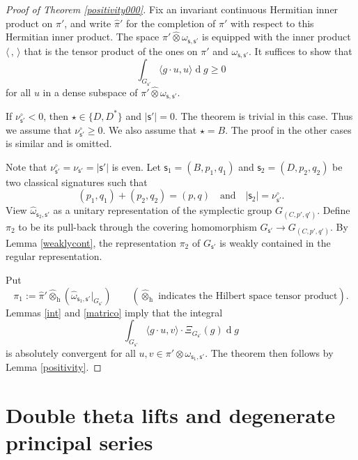 \documentclass[12pt,a4paper]{amsart}
\def\abs#1{\left|{#1}\right|}
\newcommand{\od}{\operatorname{d}}
\newcommand{\la}{\langle}
\newcommand{\ra}{\rangle}
\numberwithin{equation}{section}
\theoremstyle{remark}
\begin{document}
\begin{proof}[Proof of Theorem \ref{positivity000}]
Fix an invariant continuous Hermitian inner product on $\pi'$, and  write $\hat \pi'$ for the completion of $\pi'$ with respect to this Hermitian inner product.
The space $\pi' \widehat \otimes \omega_{\mathsf s, \mathsf s'}$ is equipped with the  inner product $\la\,,\,\ra$  that is the tensor product of the ones on $\pi'$ and $\omega_{\mathsf s, \mathsf s'} $. It suffices to show that
\[
  \int_{G_{\mathsf s'}}\la g \cdot u,u\ra\od\! g\geq 0
\]
for all $u$ in a dense subspace of $\pi' \widehat \otimes \omega_{\mathsf s, \mathsf s'}$.

If $\nu^\circ_{\mathsf s'}<0$, then $\star\in \{D, D^*\}$ and $\abs{\mathsf s'}=0$. The theorem is trivial in this case.  Thus we assume that $\nu^\circ_{\mathsf s'}\geq 0$.
We also assume that $\star=B$. The proof in the other cases is similar and is omitted.

Note that $\nu^\circ_{\mathsf s'}=\nu_{\mathsf s'}=\abs{\mathsf s'}$ is even.
 Let $\mathsf s_1=(B, p_1, q_1)$ and  $\mathsf s_2=(D, p_2, q_2)$ be two classical signatures such that
\[
  (p_1, q_1)+(p_2, q_2)=(p,q)\quad \textrm{and}\quad \abs{\mathsf s_2}=\nu^\circ_{\mathsf s'}.
\]
View $\hat \omega_{\mathsf s_2, \mathsf s'}$ as a unitary representation of the symplectic group $G_{(C, p',q')}$.
Define $\pi_2$ to be its  pull-back through the covering homomorphism $G_{\mathsf s'}\rightarrow G_{(C, p',q')}$. By Lemma \ref{weaklycont}, the representation $\pi_2$ of $G_{\mathsf s'}$ is weakly contained in the regular representation.

Put
\[
  \pi_1:=\hat \pi'\widehat \otimes_{\mathrm h} (\hat \omega_{\mathsf s_1, \mathsf s'}|_{G_{\mathsf s'}})\qquad (\textrm{$\widehat \otimes_{\mathrm h}$ indicates the Hilbert space tensor product}).
\]
 Lemmas  \ref{int} and \ref{matrico} imply that the integral
\[
 \int_{G_{\mathsf s'}} \la g\cdot u,v\ra \cdot \Xi_{G_{\mathsf s'}}(g)\od\!g
\]
is absolutely convergent for all $u,v\in \pi' \otimes \omega_{\mathsf s_1, \mathsf s'}$. The theorem then follows by Lemma \ref{positivity}.



\end{proof}



\section{Double theta lifts and degenerate principal series}\label{sec:dtheta}
\end{document}
